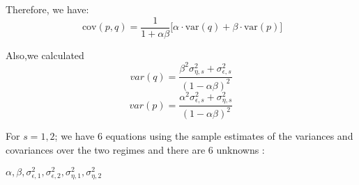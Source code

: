 \documentclass[
  12pt,
]{article}
\begin{document}
Therefore, we have:
\[~\text{cov}(p,q) = \dfrac{1}{1+\alpha\beta}\Big[\alpha\cdot\text{var}(q) + \beta\cdot\text{var}(p)\Big] \]

Also,we calculated
\[var(q) = \frac{\beta^2 \sigma^2_{\eta,s} + \sigma^2_{\epsilon,s}}{(1-\alpha \beta)^2} \]
\[var(p) = \frac{\alpha^2 \sigma^2_{\epsilon,s} + \sigma^2_{\eta,s}}{(1-\alpha \beta)^2}\]

For \(s=1,2\); we have 6 equations using the sample estimates of the
variances and covariances over the two regimes and there are 6 unknowns
:

\(\alpha, \beta, \sigma^2_{\epsilon,1}, \sigma^2_{\epsilon,2}, \sigma^2_{\eta,1}, \sigma^2_{\eta,2}\)
\end{document}
